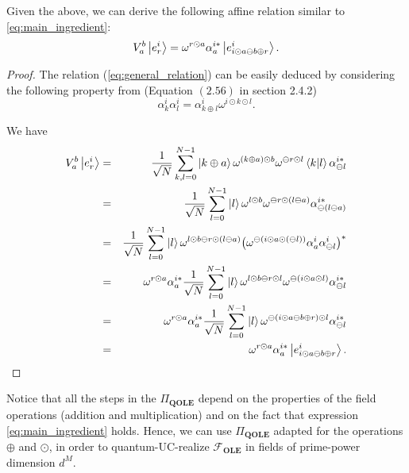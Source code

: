Given the above, we can derive the following affine relation similar to \eqref{eq:main_ingredient}:
\begin{equation}
V^b_a\ket{e^i_r} = \omega^{r\odot a} \alpha^{i*}_a \ket{e^i_{i\odot a\ominus b\oplus r}}.
\label{eq:general_relation}
\end{equation}
\begin{proof}
The relation (\ref{eq:general_relation}) can be easily deduced by considering the following property  from \cite{DEBZ10} (Equation $(2.56)$ in section 2.4.2)
\begin{equation*}
    \alpha^i_k \alpha^i_l = \alpha^i_{k\oplus l} \omega^{i\odot k\odot l}.
\end{equation*}



We have
\begin{eqnarray*}
V^b_a\ket{e^i_r} &=& \frac{1}{\sqrt{N}} \sum_{k,l = 0}^{N-1} \ket{k\oplus a}\omega^{(k\oplus a)\odot b}\omega^{\ominus r\odot l}\braket{k}{l} \alpha^{i*}_{\ominus l} \\
&=&\frac{1}{\sqrt{N}} \sum_{l=0}^{N-1}\ket{l}\omega^{l\odot b}\omega^{\ominus r\odot(l\ominus a)} \alpha^{i*}_{\ominus(l\ominus a)} \\
&=& \frac{1}{\sqrt{N}} \sum_{l=0}^{N-1}\ket{l}\omega^{l\odot b \ominus r\odot( l\ominus a)} \big(\omega^{\ominus(i\odot a\odot(\ominus l))} \alpha^i_a \alpha^i_{\ominus l} \big)^*\\
&=& \omega^{r\odot a}\alpha^{i*}_a \frac{1}{\sqrt{N}} \sum_{l=0}^{N-1}\ket{l}\omega^{l\odot b \ominus r\odot l} \omega^{\ominus(i\odot a\odot l)}  \alpha^{i*}_{\ominus l}\\
&=& \omega^{r\odot a}\alpha^{i*}_a \frac{1}{\sqrt{N}} \sum_{l=0}^{N-1}\ket{l}\omega^{\ominus(i\odot a\ominus b \oplus r)\odot l}  \alpha^{i*}_{\ominus l}\\
&=&\omega^{r\odot a} \alpha^{i*}_a \ket{e^i_{i\odot a\ominus b\oplus r}}.
\end{eqnarray*}
\end{proof}

Notice that all the steps in the $\Pi_{\textbf{QOLE}}$ depend on the properties of the field operations (addition and multiplication) and on the fact that expression \eqref{eq:main_ingredient} holds. Hence, we can use  $\Pi_{\textbf{QOLE}}$ adapted for the operations $\oplus$ and $\odot$, in order to quantum-UC-realize $\mathcal{F}_{\textbf{OLE}}$ in  fields of prime-power dimension $d^M$.


